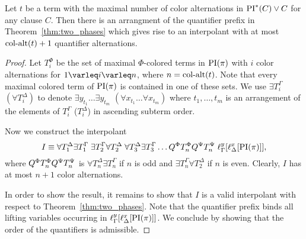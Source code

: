 \documentclass[%
	draft=false,%
	numbers=noendperiod,%
	11pt,%
	a4paper,%
	oneside,%
	openany,%
]{memoir}
\begin{document}
\begin{lemma}
	\label{lemma:quant_alt_upper_bound}
	Let $t$ be a term with the maximal number of color alternations in $\operatorname{PI}^*(C) \lor C$ for any clause $C$.
	Then there is an arrangment of the quantifier prefix in Theorem~\ref{thm:two_phases} which gives rise to an interpolant 
	with at most $\operatorname{col-alt}(t)+1$ quantifier alternations.
\end{lemma}
\begin{proof}
	Let $T_i^\Phi$ be the set of maximal $\Phi$-colored terms in $\operatorname{PI}(\pi)$ with $i$ color alternations for $1\varleq i \varleq n$, where $n=\operatorname{col-alt}(t)$.
	Note that every maximal colored term of $\operatorname{PI}(\pi)$ is contained in one of these sets.
	We use $\exists T_i^\Gamma$ $(\forall T_i^\Delta)$ to denote $ \exists y_{t_1} \dots \exists y_{t_m}$ $(\forall x_{t_1}\dots\forall x_{t_m})$ where $t_1, \dots, t_m$ is an arrangement of the elements of $T_i^\Gamma$ ($T_i^\Delta$) in ascending subterm order. 


	Now we construct the interpolant
	\[
		I \equiv 
		\forall T_1^\Delta \exists T_1^\Gamma \;
		\exists T_2^\Gamma \forall T_2^\Delta \;
		\forall T_3^\Delta \exists T_3^\Gamma
		\dots 
		Q^\Phi T_n^\Phi Q^\Psi T_n^\Psi
		\;
		\ell_{\Gamma}^{y}[\ell_{\Delta}^{x}[\operatorname{PI}(\pi)]],
	\]
	where $ Q^\Phi T_n^\Phi Q^\Psi T_n^\Psi $ is
	$\forall T_n^\Delta \exists T_n^\Gamma $ if $n$ is odd and 
	$\exists T_n^\Gamma \forall T_2^\Delta $ if $n$ is even.
	Clearly, $I$ has at most $n+1$ color alternations.

	In order to show the result, it remains to show that $I$ is a valid interpolant with respect to Theorem~\ref{thm:two_phases}. 
	Note that the quantifier prefix binds all lifting variables occurring in  
	$\ell_{\Gamma}^{y}[\ell_{\Delta}^{x}[\operatorname{PI}(\pi)]]$.
	We conclude by showing that the order of the quantifiers is admissible.


\end{proof}
\end{document}
